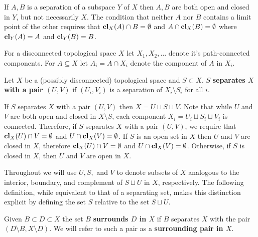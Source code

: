 If $A, B$ is a separation of a subspace $Y$ of $X$ then $A, B$ are both open and closed in $Y$, but not necessarily $X$.
The condition that neither $A$ nor $B$ contains a limit point of the other requires that $\mathbf{cl}_X(A)\cap B = \emptyset$ and $A\cap \mathbf{cl}_X(B) =\emptyset$ where $\mathbf{cl}_Y(A) = A$ and $\mathbf{cl}_Y(B) = B$.


For a disconnected topological space $X$ let $X_1, X_2, \ldots$ denote it's path-connected components.
For $A\subseteq X$ let $A_i = A\cap X_i$ denote the component of $A$ in $X_i$.

\begin{definition}
  Let $X$ be a (possibly disconnected) topological space and $S\subset X$.
  $S$ \textbf{separates $X$ with a pair $(U, V)$} if $(U_i, V_i)$ is a separation of $X_i\setminus S_i$ for all $i$.
\end{definition}

If $S$ separates $X$ with a pair $(U, V)$ then $X = U\sqcup S\sqcup V$.
Note that while $U$ and $V$ are both open and closed in $X\setminus S$, each component $X_i = U_i\sqcup S_i\sqcup V_i$ is connected.
Therefore, if $S$ separates $X$ with a pair $(U, V)$, we require that $\mathbf{cl}_X(U)\cap V = \emptyset$ and $U\cap \mathbf{cl}_X(V) = \emptyset$.
If $S$ is an open set in $X$ then $U$ and $V$ are closed in $X$, therefore $\mathbf{cl}_X(U)\cap V = \emptyset$ and $U\cap \mathbf{cl}_X(V) = \emptyset$.
Otherwise, if $S$ is closed in $X$, then $U$ and $V$ are open in $X$.


Throughout we will use $U, S,$ and $V$ to denote subsets of $X$ analogous to the interior, boundary, and complement of $S\sqcup U$ in $X$, respectively.
The following definition, while equivalent to that of a separating set, makes this distinction explicit by defining the set $S$ relative to the set $S\sqcup U$.

\begin{definition}[Surrounding]
  Given $B\subset D \subset X$ the set $B$ \textbf{surrounds $D$ in $X$} if $B$ separates $X$ with the pair $(D\setminus B, X\setminus D)$.
  We will refer to such a pair as a \textbf{surrounding pair in $X$}.
\end{definition}

